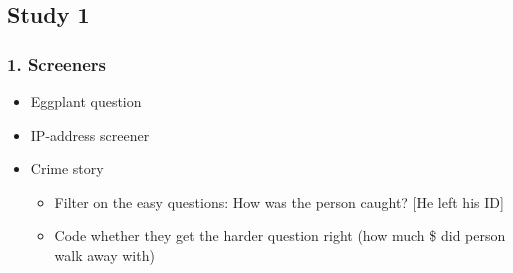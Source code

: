 \subsection{Study 1}
\subsubsection*{1. Screeners}
\begin{itemize}
    \item Eggplant question
    \item IP-address screener
    \item Crime story
    \begin{itemize}
        \item Filter on the easy questions: How was the person caught? [He left his ID]
        \item Code whether they get the harder question right (how much \$ did person walk away with)
    \end{itemize}
\end{itemize}

